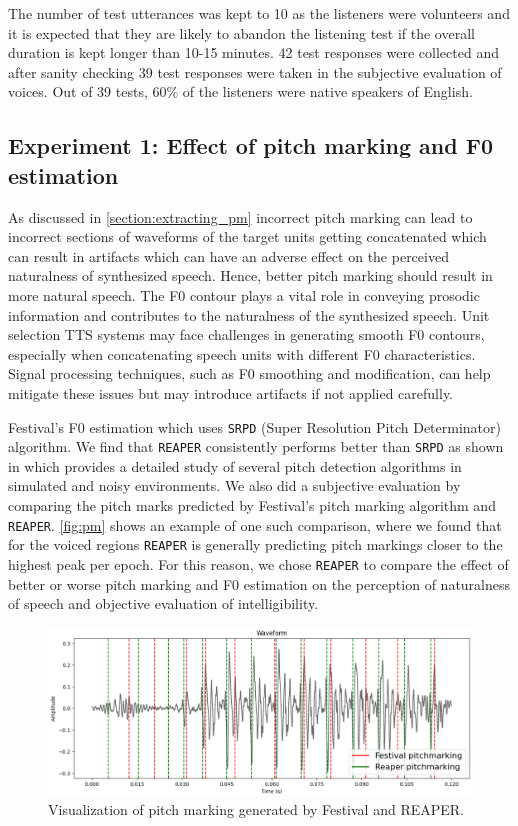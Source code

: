 \documentclass[lettersize,journal]{IEEEtran}
\begin{document}
The number of test utterances was kept to 10 as the listeners were volunteers and it is expected that they are likely to abandon the listening test if the overall duration is kept longer than 10-15 minutes. 42 test responses were collected and after sanity checking 39 test responses were taken in the subjective evaluation of voices. Out of 39 tests, $60\%$ of the listeners were native speakers of English.

\subsection{Experiment 1: Effect of pitch marking and F0 estimation}

As discussed in \ref{section:extracting_pm} incorrect pitch marking can lead to incorrect sections of waveforms of the target units getting concatenated which can result in artifacts which can have an adverse effect on the perceived naturalness of synthesized speech. Hence, better pitch marking should result in more natural speech. The F0 contour plays a vital role in conveying prosodic information and contributes to the naturalness of the synthesized speech. Unit selection TTS systems may face challenges in generating smooth F0 contours, especially when concatenating speech units with different F0 characteristics. Signal processing techniques, such as F0 smoothing and modification, can help mitigate these issues but may introduce artifacts if not applied carefully.

Festival's F0 estimation which uses \verb|SRPD| (Super Resolution Pitch Determinator) \cite{Medan1991SuperRP} algorithm. We find that \verb|REAPER| \cite{reaper} consistently performs better than \verb|SRPD| as shown in \cite{Jouvet2017PerformanceAO} which provides a detailed study of several pitch detection algorithms in simulated and noisy environments. We also did a subjective evaluation by comparing the pitch marks predicted by Festival's pitch marking algorithm and \verb|REAPER|. \autoref{fig:pm} shows an example of one such comparison, where we found that for the voiced regions \verb|REAPER| is generally predicting pitch markings closer to the highest peak per epoch. For this reason, we chose \verb|REAPER| to compare the effect of better or worse pitch marking and F0 estimation on the perception of naturalness of speech and objective evaluation of intelligibility.


\begin{figure}[!htbp]
    \centering \includegraphics[width=\textwidth]{images/pm/pm.pdf}
    \caption{Visualization of pitch marking generated by Festival and REAPER.}
    \label{fig:pm}
\end{figure}
\end{document}
